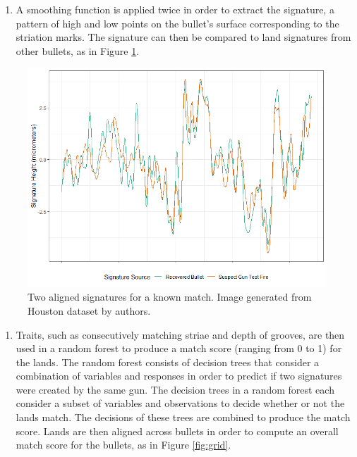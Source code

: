 \documentclass[print]{nuthesis}
\providecommand{\tightlist}{%
  \setlength{\itemsep}{0pt}\setlength{\parskip}{0pt}}
\begin{document}
\begin{enumerate}
\def\labelenumi{\arabic{enumi}.}
\setcounter{enumi}{1}
\tightlist
\item
  A smoothing function is applied twice in order to extract the signature, a pattern of high and low points on the bullet's surface corresponding to the striation marks.
  The signature can then be compared to land signatures from other bullets, as in Figure \ref{fig:signature}.
\end{enumerate}

\begin{figure}
\includegraphics[width=\linewidth]{images/F526_Match_Signatures} \caption{Two aligned signatures for a known match. Image generated from Houston dataset by authors.}\label{fig:signature}
\end{figure}

\begin{enumerate}
\def\labelenumi{\arabic{enumi}.}
\setcounter{enumi}{2}
\tightlist
\item
  Traits, such as consecutively matching striae and depth of grooves, are then used in a random forest to produce a match score (ranging from 0 to 1) for the lands.
  The random forest consists of decision trees that consider a combination of variables and responses in order to predict if two signatures were created by the same gun.
  The decision trees in a random forest each consider a subset of variables and observations to decide whether or not the lands match.
  The decisions of these trees are combined to produce the match score.
  Lands are then aligned across bullets in order to compute an overall match score for the bullets, as in Figure \ref{fig:grid}.
\end{enumerate}
\end{document}
